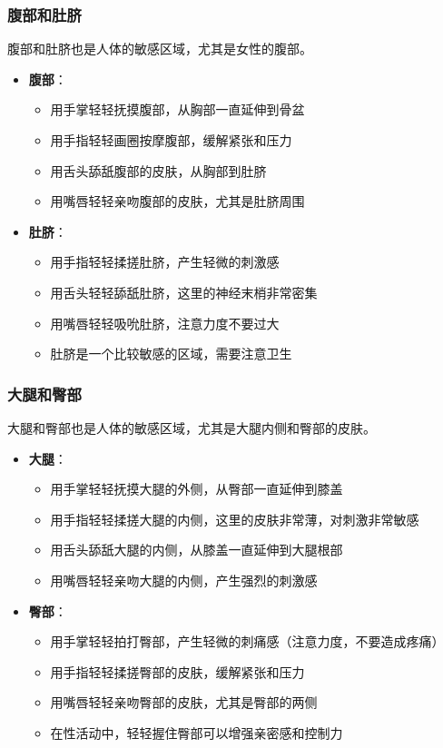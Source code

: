 \documentclass[12pt,UTF8]{ctexbook}
\begin{document}
\subsubsection{腹部和肚脐}

腹部和肚脐也是人体的敏感区域，尤其是女性的腹部。

\begin{itemize}
\item \textbf{腹部}：
  \begin{itemize}
  \item 用手掌轻轻抚摸腹部，从胸部一直延伸到骨盆
  \item 用手指轻轻画圈按摩腹部，缓解紧张和压力
  \item 用舌头舔舐腹部的皮肤，从胸部到肚脐
  \item 用嘴唇轻轻亲吻腹部的皮肤，尤其是肚脐周围
  \end{itemize}
\item \textbf{肚脐}：
  \begin{itemize}
  \item 用手指轻轻揉搓肚脐，产生轻微的刺激感
  \item 用舌头轻轻舔舐肚脐，这里的神经末梢非常密集
  \item 用嘴唇轻轻吸吮肚脐，注意力度不要过大
  \item 肚脐是一个比较敏感的区域，需要注意卫生
  \end{itemize}
\end{itemize}

\subsubsection{大腿和臀部}

大腿和臀部也是人体的敏感区域，尤其是大腿内侧和臀部的皮肤。

\begin{itemize}
\item \textbf{大腿}：
  \begin{itemize}
  \item 用手掌轻轻抚摸大腿的外侧，从臀部一直延伸到膝盖
  \item 用手指轻轻揉搓大腿的内侧，这里的皮肤非常薄，对刺激非常敏感
  \item 用舌头舔舐大腿的内侧，从膝盖一直延伸到大腿根部
  \item 用嘴唇轻轻亲吻大腿的内侧，产生强烈的刺激感
  \end{itemize}
\item \textbf{臀部}：
  \begin{itemize}
  \item 用手掌轻轻拍打臀部，产生轻微的刺痛感（注意力度，不要造成疼痛）
  \item 用手指轻轻揉搓臀部的皮肤，缓解紧张和压力
  \item 用嘴唇轻轻亲吻臀部的皮肤，尤其是臀部的两侧
  \item 在性活动中，轻轻握住臀部可以增强亲密感和控制力
  \end{itemize}
\end{itemize}
\end{document}
